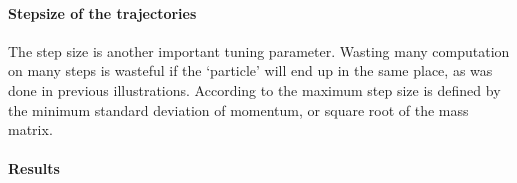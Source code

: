 \paragraph{Stepsize of the trajectories} The step size is another important tuning parameter. Wasting many computation on many steps is wasteful if the `particle' will end up in the same place, as was done in previous illustrations. According to \cite{neal2011mcmc} the maximum step size is defined by the minimum standard deviation of momentum, or square root of the mass matrix.

\paragraph{Results}





